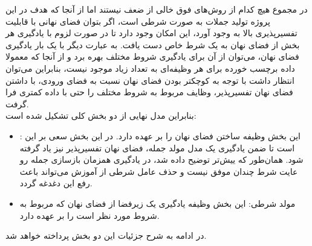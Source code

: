 در مجموع هیچ کدام از روش‌های فوق خالی از ضعف نیستند اما از آنجا که هدف در این پروژه تولید جملات به صورت شرطی است، اگر بتوان فضای نهانی با قابلیت تفسیرپذیری بالا به وجود آورد، این امکان وجود دارد تا در صورت لزوم با یادگیری هر بخش از فضای نهان به یک شرط خاص دست یافت. به عبارت دیگر با یک بار یادگیری فضای نهان، می‌توان از آن برای یادگیری شروط مختلف بهره برد و از آنجا که معمولا داده برچسب خورده برای هر وظیفه‌ای به تعداد زیاد موجود نیست، بنابراین می‌توان انتظار داشت با توجه به کوچکتر بودن فضای نهان نسبت به فضای ورودی، با داشتن فضای نهان تفسیرپذیر، وظایف مربوط به شروط مختلف را حتی با داده کمتری فرا گرفت.
\\
بنابراین مدل نهایی از دو بخش کلی تشکیل شده است:
\begin{itemize}
    \item \autoencoder{}:
    این بخش وظیفه ساختن فضای نهان را بر عهده دارد. در این بخش سعی بر این است تا ضمن یادگیری یک مدل مولد جمله، فضای نهان تفسیرپذیر نیز یاد گرفته شود. همان‌طور که ییش‌تر توضیح داده شد، \vae{} در یادگیری همزمان بازسازی جمله رو عایت شرط چندان موفق نیست و حذف عامل شرطی از آموزش \decoder{} می‌تواند باعث رفع این دغدغه گردد.
    \item
    مولد شرطی: این بخش وظیفه یادگیری یک زیرفضا از فضای نهان که مربوط به شروط مورد نظر است را بر عهده دارد.
\end{itemize}
در ادامه به شرح جزئیات این دو بخش پرداخته خواهد شد.

